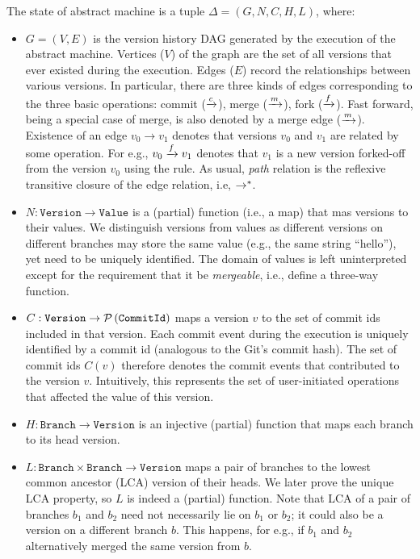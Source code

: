 The state of \quark abstract machine is a tuple $\Delta = (G,N,C,H,L)$, where:
\begin{itemize}
  \item $G = (V,E)$ is the version history DAG generated by the
    execution of the abstract machine. Vertices ($V$) of the graph are
    the set of all versions that ever existed during the execution.
    Edges ($E$) record the relationships between various versions. In
    particular, there are three kinds of edges corresponding to the
    three basic operations: commit ($\xrightarrow{c}$), merge ($\xrightarrow{m}$), fork
    ($\xrightarrow{f}$). Fast forward, being a special case of merge, is also
    denoted by a merge edge ($\xrightarrow{m}$). Existence of an edge $v_0
    \rightarrow  v_1$ denotes that versions $v_0$ and $v_1$ are related by
    some operation. For e.g., $v_0 \xrightarrow{f} v_1$ denotes that $v_1$ is a
    new version forked-off from the version $v_0$ using the
     rule. As usual, \emph{path} relation is the
    reflexive transitive closure of the edge relation, i.e,
    $\rightarrow^{*}$.

  \item $N : \texttt{Version} \rightarrow \texttt{Value}$ is a
    (partial) function (i.e., a map) that mas versions to their
    values.  We distinguish versions from values as different versions
    on different branches may store the same value (e.g., the same
    string ``hello''), yet need to be uniquely identified. The domain
    of values is left uninterpreted except for the requirement that
    it be \emph{mergeable}, i.e., define a three-way 
    function.

  \item $C : \texttt{Version} \rightarrow \mathcal{P}\left(\texttt{CommitId}\right)$
    maps a version $v$ to the set of commit ids included in that
    version. Each commit event during the execution is uniquely
    identified by a commit id (analogous to the Git's commit hash).
    The set of commit ids $C(v)$ therefore denotes the commit events
    that contributed to the version $v$. Intuitively, this represents
    the set of user-initiated operations that affected the value of
    this version.

  \item $H : \texttt{Branch} \rightarrow \texttt{Version}$ is an
    injective (partial) function that maps each branch to its head
    version. 

  \item $L: \texttt{Branch}\times\texttt{Branch} \rightarrow
    \texttt{Version}$ maps a pair of branches to the lowest common
    ancestor (LCA) version of their heads. We later prove the unique
    LCA property, so $L$ is indeed a (partial) function. Note that LCA
    of a pair of branches $b_1$ and $b_2$ need not necessarily lie on
    $b_1$ or $b_2$; it could also be a version on a different branch
    $b$. This happens, for e.g., if $b_1$ and $b_2$ alternatively
    merged the same version from $b$.
\end{itemize}

